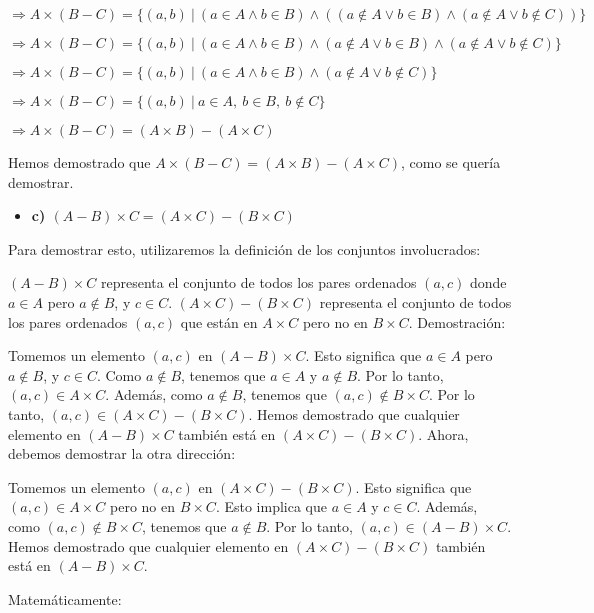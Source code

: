 \documentclass{templateNote}
\begin{document}
$\Rightarrow A \times (B - C) = \{ (a, b) \ | \ (a \in A \land b \in B) \land ((a \notin A \lor b \in B) \land (a \notin A \lor b \notin C)) \} $

$\Rightarrow A \times (B - C) = \{ (a, b) \ | \ (a \in A \land b \in B) \land (a \notin A \lor b \in B) \land (a \notin A \lor b \notin C) \}$

$\Rightarrow A \times (B - C) = \{ (a, b) \ | \ (a \in A \land b \in B) \land (a \notin A \lor b \notin C) \}$

$\Rightarrow A \times (B - C) = \{ (a, b) \ | \ a \in A, \ b \in B, \ b \notin C \}$

$\Rightarrow A \times (B - C) = (A \times B) - (A \times C)$

Hemos demostrado que \( A \times (B - C) = (A \times B) - (A \times C) \), como se quería demostrar.

\begin{itemize}
    \item \textbf{c) $(A - B) \times C = (A \times C) - (B \times C)$}
\end{itemize}

Para demostrar esto, utilizaremos la definición de los conjuntos involucrados:

$(A - B) \times C$ representa el conjunto de todos los pares ordenados $(a, c)$ donde $a \in A$ pero $a \notin B$, y $c \in C$.
$(A \times C) - (B \times C)$ representa el conjunto de todos los pares ordenados $(a, c)$ que están en $A \times C$ pero no en $B \times C$.
Demostración:

Tomemos un elemento $(a, c)$ en $(A - B) \times C$. Esto significa que $a \in A$ pero $a \notin B$, y $c \in C$.
Como $a \notin B$, tenemos que $a \in A$ y $a \notin B$.
Por lo tanto, $(a, c) \in A \times C$.
Además, como $a \notin B$, tenemos que $(a, c) \notin B \times C$.
Por lo tanto, $(a, c) \in (A \times C) - (B \times C)$.
Hemos demostrado que cualquier elemento en $(A - B) \times C$ también está en $(A \times C) - (B \times C)$. Ahora, debemos demostrar la otra dirección:

Tomemos un elemento $(a, c)$ en $(A \times C) - (B \times C)$. Esto significa que $(a, c) \in A \times C$ pero no en $B \times C$.
Esto implica que $a \in A$ y $c \in C$.
Además, como $(a, c) \notin B \times C$, tenemos que $a \notin B$.
Por lo tanto, $(a, c) \in (A - B) \times C$.
Hemos demostrado que cualquier elemento en $(A \times C) - (B \times C)$ también está en $(A - B) \times C$.

Matemáticamente:
\end{document}
